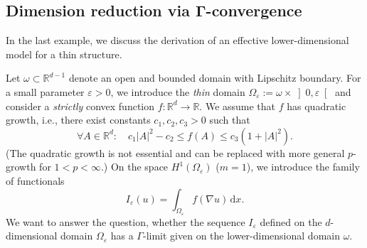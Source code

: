 \documentclass[a4paper,12pt]{article}
\newcommand{\R}{\mathbb{R}}
\newcommand{\eps}{\varepsilon}
\newcommand{\dd}{\,\mathrm{d}}
\begin{document}
\setcounter{section}{5}
\setcounter{subsection}{2}
\subsection{Dimension reduction via $\boldsymbol{\Gamma}$-convergence}
In the last example, we discuss the derivation of an effective lower-dimensional model for a thin structure.

Let $\omega\subset \R^{d-1}$ denote an open and bounded domain with Lipschitz boundary. For a small parameter $\eps>0$, we introduce the \emph{thin}
domain $\Omega_\eps := \omega\times \left]0,\eps\right[$ and consider a \emph{strictly} convex function $f:\R^{d} \to \R$. We assume that $f$ has quadratic growth, i.e., there exist constants $c_1,c_2,c_3>0$
such that
\[
\forall A\in\R^d:\quad c_1|A|^2 -c_2\leq f(A) \leq c_3(1+|A|^2).
\]
(The quadratic growth is not essential and can be replaced with more general $p$-growth for $1<p<\infty$.)
On the space $H^1(\Omega_\eps)$ ($m=1$), we introduce the family of functionals
\[
I_\eps(u) = \int_{\Omega_\eps}f(\nabla u)\dd x.
\]
We want to answer the question, whether the sequence $I_\eps$ defined on the $d$-dimensional domain $\Omega_\eps$ has a $\Gamma$-limit given on the lower-dimensional domain $\omega$.
\end{document}
